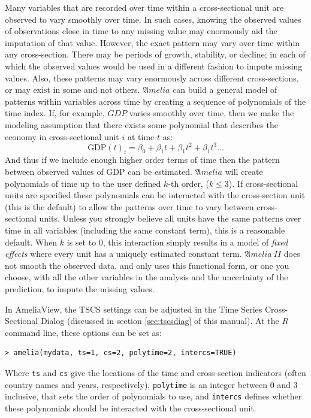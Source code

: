 \documentclass[12pt,titlepage]{article}
\newcommand{\AmeliaII}{\ensuremath{\mathfrak Amelia~II} }
\begin{document}
Many variables that are recorded over time within a cross-sectional
unit are observed to vary smoothly over time.  In such cases, knowing
the observed values of observations close in time to any missing value
may enormously aid the imputation of that value.  However, the exact
pattern may vary over time within any cross-section.  There may be
periods of growth, stability, or decline; in each of which the
observed values would be used in a different fashion to impute missing
values.  Also, these patterns may vary enormously across different
cross-sections, or may exist in some and not others.  ${\mathfrak
  Amelia}$ can build a general model of patterns within variables
across time by creating a sequence of polynomials of the time index.
If, for example, $GDP$ varies smoothly over time, then we make the
modeling assumption that there exists some polynomial that describes
the economy in cross-sectional unit $i$ at time $t$ as:
\begin{equation}
\textrm{GDP}(t)_i = \beta_0 + \beta_1 t + \beta_1 t^2 + \beta_1 t^3 \ldots
\end{equation}
And thus if we include enough higher order terms of time then the
pattern between observed values of GDP can be estimated.  ${\mathfrak
  Amelia}$ will create polynomials of time up to the user defined
$k$-th order, ($k\leq3$).  If cross-sectional units are specified
these polynomials can be interacted with the cross-section unit (this
is the default) to allow the patterns over time to vary between
cross-sectional units.  Unless you strongly believe all units have the
same patterns over time in all variables (including the same constant term), this is a reasonable
default.  When $k$ is set to 0, this interaction simply results in a
model of \emph{fixed effects} where every unit has a uniquely
estimated constant term.  \AmeliaII does not smooth the observed data,
and only uses this functional form, or one you choose, with all the
other variables in the analysis and the uncertainty of the prediction,
to impute the missing values.

In AmeliaView, the TSCS settings can be adjusted in the Time Series
Cross-Sectional Dialog (discussed in section \ref{sec:tscsdiag} of
this manual).  At the $R$ command line, these options can be set as:

\begin{verbatim}
> amelia(mydata, ts=1, cs=2, polytime=2, intercs=TRUE)
\end{verbatim} 

Where \texttt{ts} and \texttt{cs} give the locations of the time and
cross-section indicators (often country names and years,
respectively), \texttt{polytime} is an integer between 0 and 3
inclusive, that sets the order of polynomials to use, and
\texttt{intercs} defines whether these polynomials should be
interacted with the cross-sectional unit.
\end{document}
